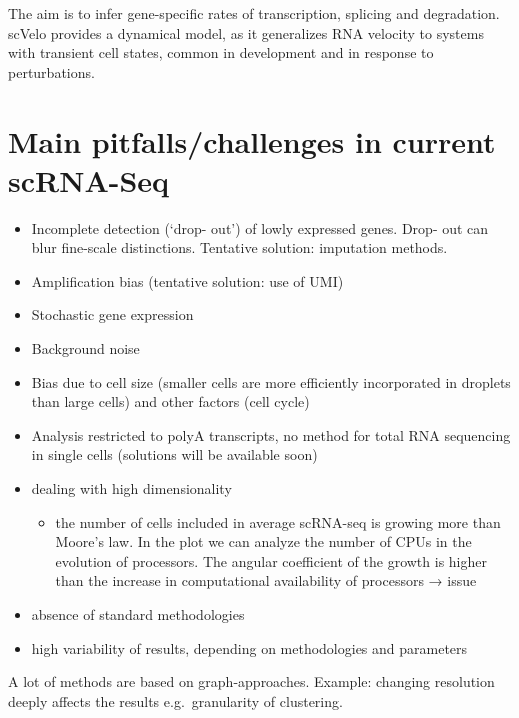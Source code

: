 The aim is to infer gene-specific rates of transcription, splicing and
degradation. scVelo provides a dynamical model, as it generalizes RNA
velocity to systems with transient cell states, common in development
and in response to perturbations.

\hypertarget{main-pitfallschallenges-in-current-scrna-seq}{%
\section{Main pitfalls/challenges in current
scRNA-Seq}\label{main-pitfallschallenges-in-current-scrna-seq}}

\begin{itemize}
\tightlist
\item
  Incomplete detection (`drop- out') of lowly expressed genes. Drop- out
  can blur fine-scale distinctions. Tentative solution: imputation
  methods.
\item
  Amplification bias (tentative solution: use of UMI)
\item
  Stochastic gene expression
\item
  Background noise
\item
  Bias due to cell size (smaller cells are more efficiently incorporated
  in droplets than large cells) and other factors (cell cycle)
\item
  Analysis restricted to polyA transcripts, no method for total RNA
  sequencing in single cells (solutions will be available soon)
\item
  dealing with high dimensionality

  \begin{itemize}
  \tightlist
  \item
    the number of cells included in average scRNA-seq is growing more
    than Moore's law. In the plot we can analyze the number of CPUs in
    the evolution of processors. The angular coefficient of the growth
    is higher than the increase in computational availability of
    processors → issue
  \end{itemize}
\item
  absence of standard methodologies
\item
  high variability of results, depending on methodologies and parameters
\end{itemize}

A lot of methods are based on graph-approaches. Example: changing
resolution deeply affects the results e.g.~granularity of clustering.
